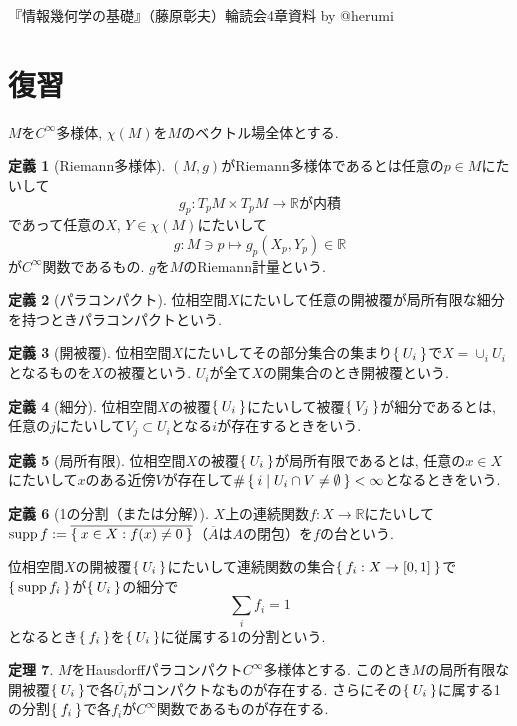 \documentclass{jsarticle}
\newcommand{\RR}{\mathbb{R}}
\newcommand{\makeop}[1]{\mathop{\mathrm{#1}}\nolimits}
\newcommand{\supp}{\makeop{supp}}
\theoremstyle{definition}
\newtheorem{theorem}{定理}
\newtheorem{definition}[theorem]{定義}
\numberwithin{theorem}{section}
\begin{document}
『情報幾何学の基礎』（藤原彰夫）輪読会4章資料 by @herumi

\section{復習}
$M$を$C^\infty$多様体, $\chi(M)$を$M$のベクトル場全体とする.
\begin{definition}[Riemann多様体]
$(M,g)$がRiemann多様体であるとは任意の$p \in M$にたいして
\[
g_p : T_pM \times T_pM \rightarrow \RR\text{が内積}
\]
であって任意の$X$, $Y \in \chi(M)$にたいして
\[
g:M \ni p \mapsto g_p(X_p,Y_p)\in \RR
\]
が$C^\infty$関数であるもの. $g$を$M$のRiemann計量という.
\end{definition}

\begin{definition}[パラコンパクト]
位相空間$X$にたいして任意の開被覆が局所有限な細分を持つときパラコンパクトという.
\end{definition}

\begin{definition}[開被覆]
位相空間$X$にたいしてその部分集合の集まり$\Set{U_i}$で$X=\cup_i U_i$となるものを$X$の被覆という.
$U_i$が全て$X$の開集合のとき開被覆という.
\end{definition}

\begin{definition}[細分]
位相空間$X$の被覆$\Set{U_i}$にたいして被覆$\Set{V_j}$が細分であるとは,
任意の$j$にたいして$V_j \subset U_i$となる$i$が存在するときをいう.
\end{definition}

\begin{definition}[局所有限]
位相空間$X$の被覆$\Set{U_i}$が局所有限であるとは, 任意の$x \in X$にたいして$x$のある近傍$V$が存在して$\#\Set{i|U_i \cap V \ne \emptyset}<\infty$となるときをいう.
\end{definition}

\begin{definition}[1の分割（または分解）]
$X$上の連続関数$f:X \rightarrow \RR$にたいして$\supp{f}:=\overline{\Set{x\in X:f(x) \neq 0}}$（$\overline{A}$は$A$の閉包）を$f$の台という.

位相空間$X$の開被覆$\Set{U_i}$にたいして連続関数の集合$\Set{f_i:X \rightarrow [0,1]}$で$\Set{\supp{f_i}}$が$\Set{U_i}$の細分で
\[
\sum_i f_i=1
\]
となるとき$\Set{f_i}$を$\Set{U_i}$に従属する1の分割という.
\end{definition}

\begin{theorem}
$M$をHausdorffパラコンパクト$C^\infty$多様体とする.
このとき$M$の局所有限な開被覆$\Set{U_i}$で各$\overline{U_i}$がコンパクトなものが存在する.
さらにその$\Set{U_i}$に属する1の分割$\Set{f_i}$で各$f_i$が$C^\infty$関数であるものが存在する.
\end{theorem}
\end{document}
